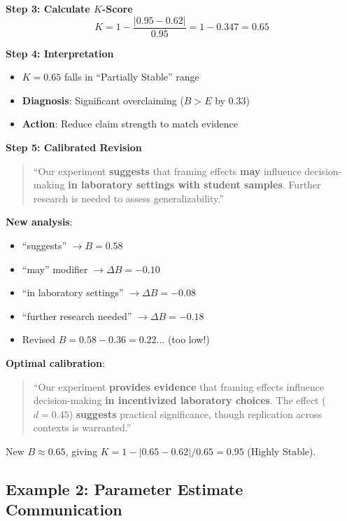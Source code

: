 \documentclass[11pt,a4paper]{article}
\begin{document}
\textbf{Step 3: Calculate $K$-Score}
\begin{equation*}
K = 1 - \frac{|0.95 - 0.62|}{0.95} = 1 - 0.347 = 0.65
\end{equation*}

\textbf{Step 4: Interpretation}
\begin{itemize}
    \item $K = 0.65$ falls in ``Partially Stable'' range
    \item \textbf{Diagnosis}: Significant overclaiming ($B > E$ by 0.33)
    \item \textbf{Action}: Reduce claim strength to match evidence
\end{itemize}

\textbf{Step 5: Calibrated Revision}
\begin{quote}
``Our experiment \textbf{suggests} that framing effects \textbf{may} influence decision-making \textbf{in laboratory settings with student samples}. Further research is needed to assess generalizability.''
\end{quote}

\textbf{New analysis}:
\begin{itemize}
    \item ``suggests'' $\to B = 0.58$
    \item ``may'' modifier $\to \Delta B = -0.10$
    \item ``in laboratory settings'' $\to \Delta B = -0.08$
    \item ``further research needed'' $\to \Delta B = -0.18$
    \item Revised $B = 0.58 - 0.36 = 0.22$... (too low!)
\end{itemize}

\textbf{Optimal calibration}:
\begin{quote}
``Our experiment \textbf{provides evidence} that framing effects influence decision-making \textbf{in incentivized laboratory choices}. The effect ($d = 0.45$) \textbf{suggests} practical significance, though replication across contexts is warranted.''
\end{quote}

New $B \approx 0.65$, giving $K = 1 - |0.65 - 0.62| / 0.65 = 0.95$ (Highly Stable).

\subsection{Example 2: Parameter Estimate Communication}
\end{document}
